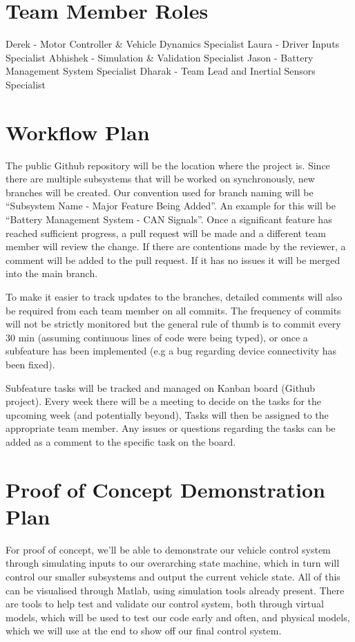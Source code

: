 \documentclass{article}
\begin{document}
\section{Team Member Roles}

Derek - Motor Controller \& Vehicle Dynamics Specialist
Laura - Driver Inputs Specialist
Abhishek - Simulation \& Validation Specialist
Jason - Battery Management System Specialist
Dharak - Team Lead and Inertial Sensors Specialist

\section{Workflow Plan}

The public Github repository will be the location where the project is.
Since there are multiple subsystems that will be worked on synchronously,
new branches will be created. Our convention used for branch naming will be
“Subsystem Name - Major Feature Being Added”. An example for this will be 
“Battery Management System - CAN Signals”. Once a significant feature has 
reached sufficient progress, a pull request will be made and a different 
team member will review the change. If there are contentions made by the 
reviewer, a comment will be added to the pull request. If it has no issues 
it will be merged into the main branch.

To make it easier to track updates to the branches, detailed comments will 
also be required from each team member on all commits. The frequency of 
commits will not be strictly monitored but the general rule of thumb is to
commit every 30 min (assuming continuous lines of code were being typed), 
or once a subfeature has been implemented (e.g a bug regarding device 
connectivity has been fixed). 

Subfeature tasks will be tracked and managed on Kanban board (Github 
project). Every week there will be a meeting to decide on the tasks for the
upcoming week (and potentially beyond), Tasks will then be assigned to the 
appropriate team member. Any issues or questions regarding the tasks can be 
added as a comment to the specific task on the board.

\section{Proof of Concept Demonstration Plan}

For proof of concept, we’ll be able to demonstrate our vehicle control 
system through simulating inputs to our overarching state machine, which in 
turn will control our smaller subsystems and output the current vehicle state. 
All of this can be visualised through Matlab, using simulation tools already 
present. There are tools to help test and validate our control system, both 
through virtual models, which will be used to test our code early and often, 
and physical models, which we will use at the end to show off our final 
control system.
\end{document}
